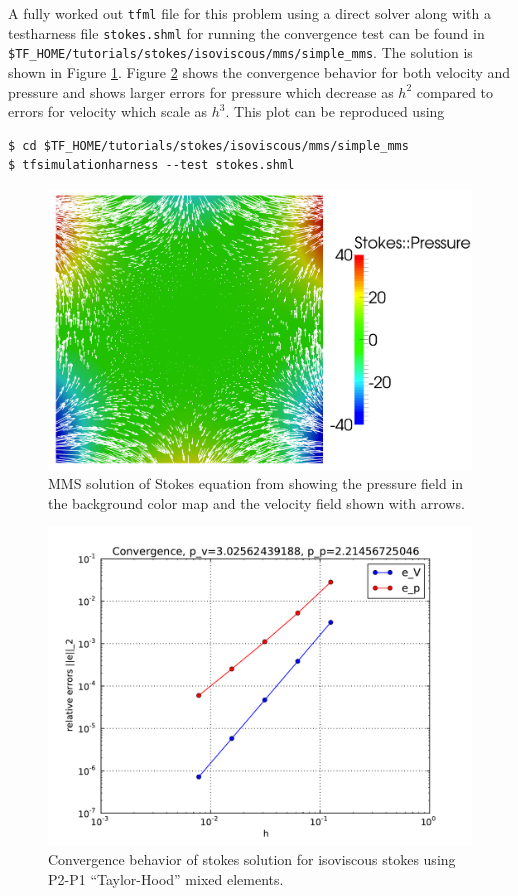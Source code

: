 A fully worked out \texttt{tfml} file for this problem using a direct
solver along with a testharness file \texttt{stokes.shml} for running
the convergence test can be
found in \texttt{\$TF\_HOME/tutorials/stokes/isoviscous/mms/simple\_mms}.
The solution is shown in Figure \ref{fig:stokesMMS}.  Figure
\ref{fig:stokes_convergence}  shows the convergence behavior for both
velocity and pressure and shows larger errors for pressure which
decrease as $h^{2}$ compared to errors for velocity which scale as
$h^{3}$. This plot can be reproduced using
\begin{lstlisting}[style=Bash]
$ cd $TF_HOME/tutorials/stokes/isoviscous/mms/simple_mms
$ tfsimulationharness --test stokes.shml
\end{lstlisting} %


\begin{figure}[htbp!]
  \centering
  \includegraphics[width=.7\textwidth]{figures/stokes_flow.png}
  \caption{MMS solution of Stokes equation from
    \cite{elman_finite_2005} showing the pressure field in the background color map and the velocity field shown with arrows.}
  \label{fig:stokesMMS}
\end{figure}
\begin{figure}[htbp!]
  \centering
  \includegraphics[width=.7\textwidth]{figures/Stokes_convergence.pdf}
  \caption{Convergence behavior of stokes solution for isoviscous
    stokes using P2-P1 ``Taylor-Hood'' mixed elements.}
  \label{fig:stokes_convergence}
\end{figure}

